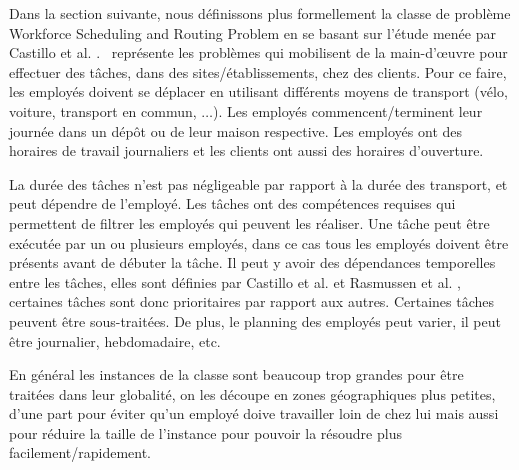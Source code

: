 Dans la section suivante, nous définissons plus formellement la classe de problème Workforce Scheduling and Routing Problem en se basant sur l'étude menée par Castillo et al. \cite{Castillo2016}. \wsrp ~représente les problèmes qui mobilisent de la main-d’œuvre pour effectuer des tâches, dans des sites/établissements, chez des clients. 
Pour ce faire, les employés doivent se déplacer en utilisant différents moyens de transport (vélo, voiture, transport en commun, $\ldots$). Les employés commencent/terminent leur journée dans un dépôt ou de leur maison respective. Les employés ont des horaires de travail journaliers et les clients ont aussi des horaires d'ouverture.

La durée des tâches n'est pas négligeable par rapport à la durée des transport, et peut dépendre de l'employé.
Les tâches ont des compétences requises qui permettent de filtrer les employés qui peuvent les réaliser.
Une tâche peut être exécutée par un ou plusieurs employés, dans ce cas tous les employés doivent être présents avant de débuter la tâche.
Il peut y avoir des dépendances temporelles entre les tâches, elles sont définies par Castillo et al. et Rasmussen et al. \cite{Castillo2015,Rasmussen2010}, certaines tâches sont donc prioritaires par rapport aux autres. 
Certaines tâches peuvent être sous-traitées.
De plus, le planning des employés peut varier, il peut être journalier, hebdomadaire, etc.

En général les instances de la classe \wsrp sont beaucoup trop grandes pour être traitées dans leur globalité, on les découpe en zones géographiques plus petites, d'une part pour éviter qu'un employé doive travailler loin de chez lui mais aussi pour réduire la taille de l'instance pour pouvoir la résoudre plus facilement/rapidement.

